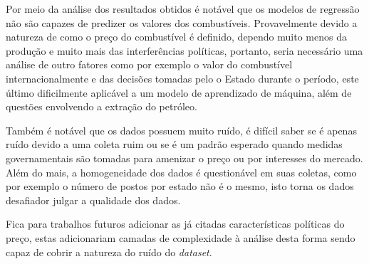 Por meio da análise dos resultados obtidos é notável que os modelos de regressão não são capazes de predizer
os valores dos combustíveis. Provavelmente devido a natureza de como o preço do combustível é definido, dependo
muito menos da produção e muito mais das interferências políticas, portanto, seria necessário uma análise 
de outro fatores como por exemplo o valor do combustível internacionalmente e das decisões tomadas 
pelo o Estado durante o período, este último dificilmente aplicável a um modelo de aprendizado de máquina, além de questões envolvendo a extração do petróleo.

Também é notável que os dados possuem muito ruído, é difícil saber se é apenas ruído devido a uma coleta ruim ou se 
é um padrão esperado quando medidas governamentais são tomadas para amenizar o preço ou por interesses do mercado. Além do mais, a homogeneidade dos dados é questionável em suas coletas, como por exemplo o número de postos por estado não é o mesmo, isto torna os dados desafiador julgar a qualidade dos dados.

Fica para trabalhos futuros adicionar as já citadas características políticas do preço, estas adicionariam camadas de complexidade à análise desta forma sendo capaz de cobrir a natureza do ruído do \textit{dataset}.

